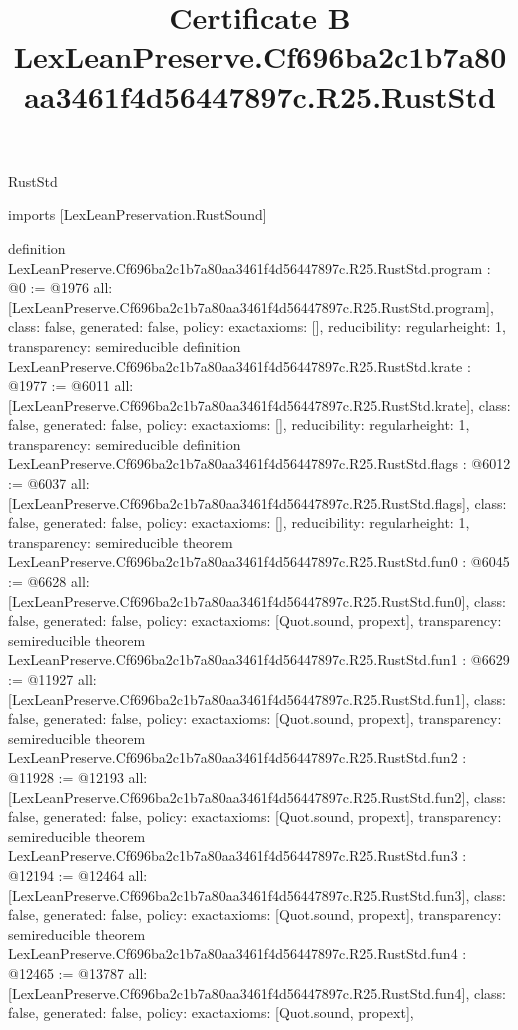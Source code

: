 \begin{lexlean}{RustStd}
\title{Certificate B LexLeanPreserve.Cf696ba2c1b7a80aa3461f4d56447897c.R25.RustStd}
\begin{coremodule}
imports [LexLeanPreservation.RustSound]

definition LexLeanPreserve.Cf696ba2c1b7a80aa3461f4d56447897c.R25.RustStd.program : @0 := @1976 {
  all: [LexLeanPreserve.Cf696ba2c1b7a80aa3461f4d56447897c.R25.RustStd.program],
  class: false,
  generated: false,
  policy: exact{axioms: []},
  reducibility: regular{height: 1},
  transparency: semireducible
}
definition LexLeanPreserve.Cf696ba2c1b7a80aa3461f4d56447897c.R25.RustStd.krate : @1977 := @6011 {
  all: [LexLeanPreserve.Cf696ba2c1b7a80aa3461f4d56447897c.R25.RustStd.krate],
  class: false,
  generated: false,
  policy: exact{axioms: []},
  reducibility: regular{height: 1},
  transparency: semireducible
}
definition LexLeanPreserve.Cf696ba2c1b7a80aa3461f4d56447897c.R25.RustStd.flags : @6012 := @6037 {
  all: [LexLeanPreserve.Cf696ba2c1b7a80aa3461f4d56447897c.R25.RustStd.flags],
  class: false,
  generated: false,
  policy: exact{axioms: []},
  reducibility: regular{height: 1},
  transparency: semireducible
}
theorem LexLeanPreserve.Cf696ba2c1b7a80aa3461f4d56447897c.R25.RustStd.fun0 : @6045 := @6628 {
  all: [LexLeanPreserve.Cf696ba2c1b7a80aa3461f4d56447897c.R25.RustStd.fun0],
  class: false,
  generated: false,
  policy: exact{axioms: [Quot.sound, propext]},
  transparency: semireducible
}
theorem LexLeanPreserve.Cf696ba2c1b7a80aa3461f4d56447897c.R25.RustStd.fun1 : @6629 := @11927 {
  all: [LexLeanPreserve.Cf696ba2c1b7a80aa3461f4d56447897c.R25.RustStd.fun1],
  class: false,
  generated: false,
  policy: exact{axioms: [Quot.sound, propext]},
  transparency: semireducible
}
theorem LexLeanPreserve.Cf696ba2c1b7a80aa3461f4d56447897c.R25.RustStd.fun2 : @11928 := @12193 {
  all: [LexLeanPreserve.Cf696ba2c1b7a80aa3461f4d56447897c.R25.RustStd.fun2],
  class: false,
  generated: false,
  policy: exact{axioms: [Quot.sound, propext]},
  transparency: semireducible
}
theorem LexLeanPreserve.Cf696ba2c1b7a80aa3461f4d56447897c.R25.RustStd.fun3 : @12194 := @12464 {
  all: [LexLeanPreserve.Cf696ba2c1b7a80aa3461f4d56447897c.R25.RustStd.fun3],
  class: false,
  generated: false,
  policy: exact{axioms: [Quot.sound, propext]},
  transparency: semireducible
}
theorem LexLeanPreserve.Cf696ba2c1b7a80aa3461f4d56447897c.R25.RustStd.fun4 : @12465 := @13787 {
  all: [LexLeanPreserve.Cf696ba2c1b7a80aa3461f4d56447897c.R25.RustStd.fun4],
  class: false,
  generated: false,
  policy: exact{axioms: [Quot.sound, propext]},
}
\end{coremodule}
\end{lexlean}
